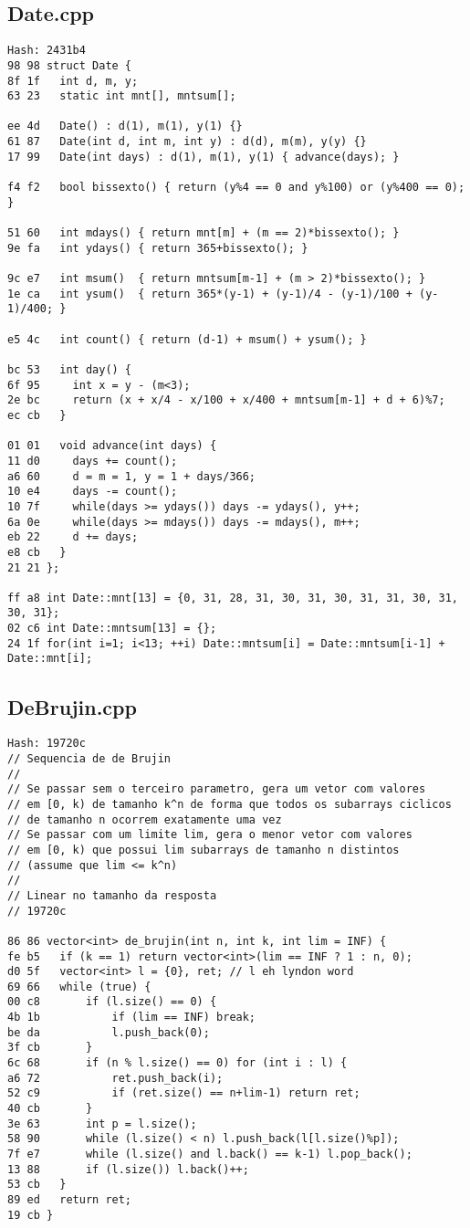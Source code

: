 \documentclass[11pt, a4paper, twoside]{article}
\begin{document}
\subsection{Date.cpp}
\begin{lstlisting}
Hash: 2431b4
98 98 struct Date {
8f 1f   int d, m, y;
63 23   static int mnt[], mntsum[];
      
ee 4d   Date() : d(1), m(1), y(1) {}
61 87   Date(int d, int m, int y) : d(d), m(m), y(y) {}
17 99   Date(int days) : d(1), m(1), y(1) { advance(days); }
      
f4 f2   bool bissexto() { return (y%4 == 0 and y%100) or (y%400 == 0); }
      
51 60   int mdays() { return mnt[m] + (m == 2)*bissexto(); }
9e fa   int ydays() { return 365+bissexto(); }
      
9c e7   int msum()  { return mntsum[m-1] + (m > 2)*bissexto(); }
1e ca   int ysum()  { return 365*(y-1) + (y-1)/4 - (y-1)/100 + (y-1)/400; }
      
e5 4c   int count() { return (d-1) + msum() + ysum(); }
      
bc 53   int day() {
6f 95     int x = y - (m<3);
2e bc     return (x + x/4 - x/100 + x/400 + mntsum[m-1] + d + 6)%7;
ec cb   }
      
01 01   void advance(int days) {
11 d0     days += count();
a6 60     d = m = 1, y = 1 + days/366;
10 e4     days -= count();
10 7f     while(days >= ydays()) days -= ydays(), y++;
6a 0e     while(days >= mdays()) days -= mdays(), m++;
eb 22     d += days;
e8 cb   }
21 21 };

ff a8 int Date::mnt[13] = {0, 31, 28, 31, 30, 31, 30, 31, 31, 30, 31, 30, 31};
02 c6 int Date::mntsum[13] = {};
24 1f for(int i=1; i<13; ++i) Date::mntsum[i] = Date::mntsum[i-1] + Date::mnt[i];
\end{lstlisting}

\subsection{DeBrujin.cpp}
\begin{lstlisting}
Hash: 19720c
// Sequencia de de Brujin
//
// Se passar sem o terceiro parametro, gera um vetor com valores
// em [0, k) de tamanho k^n de forma que todos os subarrays ciclicos
// de tamanho n ocorrem exatamente uma vez
// Se passar com um limite lim, gera o menor vetor com valores
// em [0, k) que possui lim subarrays de tamanho n distintos
// (assume que lim <= k^n)
//
// Linear no tamanho da resposta
// 19720c

86 86 vector<int> de_brujin(int n, int k, int lim = INF) {
fe b5 	if (k == 1) return vector<int>(lim == INF ? 1 : n, 0);
d0 5f 	vector<int> l = {0}, ret; // l eh lyndon word
69 66 	while (true) {
00 c8 		if (l.size() == 0) {
4b 1b 			if (lim == INF) break;
be da 			l.push_back(0);
3f cb 		}
6c 68 		if (n % l.size() == 0) for (int i : l) {
a6 72 			ret.push_back(i);
52 c9 			if (ret.size() == n+lim-1) return ret;
40 cb 		}
3e 63 		int p = l.size();
58 90 		while (l.size() < n) l.push_back(l[l.size()%p]);
7f e7 		while (l.size() and l.back() == k-1) l.pop_back();
13 88 		if (l.size()) l.back()++;
53 cb 	}
89 ed 	return ret;
19 cb }
\end{lstlisting}
\end{document}
